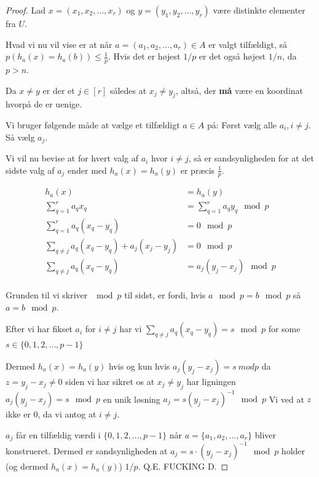 \documentclass[11pt]{article}
\theoremstyle{definition}
\theoremstyle{remark}
\begin{document}
\begin{proof}
  Lad $x = (x_{1}, x_{2}, \ldots, x_{r})$ og $y = (y_{1}, y_{2}, \ldots, y_{r})$ være distinkte elementer fra $U$.

  Hvad vi nu vil vise er at når $a = (a_{1}, a_{2}, \ldots, a_{r}) \in A$ er valgt tilfældigt, så $p(h_{a}(x) = h_{a}(b)) \leq \frac{1}{p}$. Hvis det er højest $1/p$ er det også højest $1/n$, da $p > n$.

  Da $x \neq y$ er der et $j \in [r]$ således at $x_{j} \neq y_{j}$, altså, der \textbf{må} være en koordinat hvorpå de er uenige.

  Vi bruger følgende måde at vælge et tilfældigt $a \in A$ på:
  Først vælg alle $a_{i}, i \neq j$. Så vælg $a_{j}$. 


  Vi vil nu bevise at for hvert valg af $a_{i}$ hvor $i \neq j$, så er sandsynligheden for at det sidste valg af $a_{j}$ ender med $h_{a}(x) = h_{a}(y)$ er præcis $\frac{1}{p}$.

  \begin{equation}
\begin{split}
             h_{a}(x) &= h_{a}(y) \\
  \sum_{q=1}^{r}a_{q}x_{q} &= \sum_{q=1}^{r} a_{q}y_{q} \mod p \\
  \sum_{q = 1}^{r} a_{q}(x_{q}-y_{q}) &= 0 \mod p\\
  \sum_{q \neq j} a_{q} (x_{q} - y_{q}) + a_{j} (x_{j} - y_{j}) &= 0 \mod p \\
  \sum_{q \neq j} a_{q} (x_{q}-y_{q}) &= a_{j}(y_{j}-x_{j}) \mod p\\
  \end{split}
    \end{equation}

    Grunden til vi skriver $\mod p$ til sidst, er fordi, hvis $a \mod p = b \mod p$ så $a = b \mod p$.

    Efter vi har fikset $a_{i}$ for $i \neq j$ har vi $\sum_{q \neq j} a_{q}(x_{q} - y_{q}) = s \mod p$ for some $s \in \{0,1,2, \ldots, p-1\}$

    Dermed $h_{a}(x) = h_{a}(y)$ hvis og kun hvis $a_{j}(y_{j}-x_{j}) = s \ mod p$ da $z = y_{j} - x_{j} \neq 0$ siden vi har sikret os at $x_{j} \neq y_{j}$ har ligningen $a_{j}(y_{j}-x_{j}) = s \mod p$ en unik løsning $a_{j} = s (y_{j}-x_{j})^{-1} \mod p$
    Vi ved at $z$ ikke er 0, da vi antog at $i \neq j$.

    $a_{j}$ får en tilfældig værdi i $\{0, 1, 2, \ldots, p-1\}$ når $a = \{a_{1}, a_{2}, \ldots, a_{r}\}$ bliver konstrueret. Dermed er sandsynligheden at $a_{j} = s \cdot (y_{j} - x_{j})^{-1} \mod p$ holder (og dermed $h_{a}(x) = h_{a}(y)$) $1/p$. Q.E. FUCKING D.
\end{proof}
\end{document}
